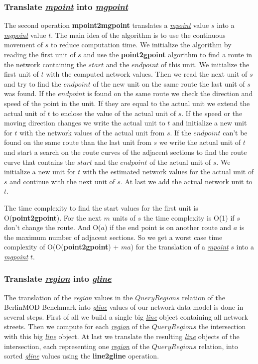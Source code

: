 \documentclass[a4paper]{article}
\newcommand{\bmodb} {BerlinMOD Benchmark}
\newcommand{\op}[1]{\textbf{#1}}
\newcommand{\dt}[1]{\textsl{\underline{#1}}}
\begin{document}
{\subsubsection{Translate \dt{mpoint} into \dt{mgpoint}}
The second operation \op{mpoint2mgpoint} translates a \dt{mpoint} value $s$
into a \dt{mgpoint} value $t$. The main idea of the algorithm is to use the
continuous movement of $s$ to reduce computation time. We initialize the
algorithm by reading the first unit of $s$ and use the \op{point2gpoint}
algorithm to find a route in the network containing the $start$ and
the $end point$ of this unit. We initialize the first unit of $t$ with
the computed network values. Then we read the next unit of $s$ and try to find
the $end point$ of the new unit on the same route the last unit of $s$ was
found. If the $end point$ is found on the same route we check the direction and
speed of the point in the unit. If they are equal to the actual unit we extend
the actual unit of $t$ to enclose the value of the actual unit of $s$. If the
speed or the moving direction changes we write the actual unit to $t$ and initialize
a new unit for $t$ with the network values of the actual unit from $s$.
If the $end point$ can't be found on the same route than the last unit from
$s$ we write the actual unit of $t$ and start a search on the route curves
of the adjacent sections to find the route curve that contains the $start$
and the $end point$ of the actual unit of $s$. We initialize a new unit
for $t$ with the estimated network values for the actual unit of $s$ and
continue with the next unit of $s$. At last we add the actual network unit
to $t$.

The time complexity to find the start values for the first unit is O(\op{point2gpoint}).
For the next $m$ units of $s$ the time complexity is O(1) if $s$ don't change the
route. And O($a$) if the end point is on another route and $a$ is the maximum
number of adjacent sections. So we get a worst case time complexity of
O(O(\op{point2gpoint}) + $ma$) for the translation of a \dt{mpoint} $s$ into a
\dt{mgpoint} $t$.

\subsubsection{Translate \dt{region} into \dt{gline}}
The translation of the \dt{region} values in the $QueryRegions$ relation of the
\bmodb{} into \dt{gline} values of our network data model is done in several steps.
First of all we build a single big \dt{line} object containing all network streets.
Then we compute for each \dt{region} of the $QueryRegions$ the intersection with
this big \dt{line} object. At last we translate the resulting \dt{line} objects
of the intersection, each representing one \dt{region} of the $QueryRegions$
relation, into sorted \dt{gline} values using the \op{line2gline} operation.

}
\end{document}
